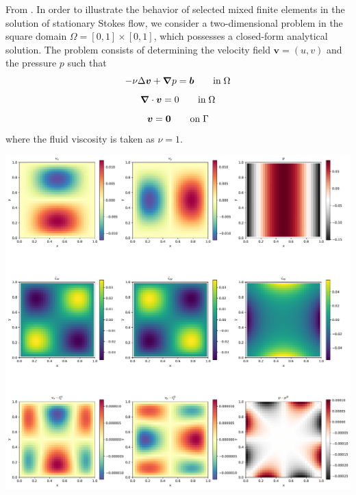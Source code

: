 
From \cite{dohu}. In order to illustrate the behavior of selected mixed finite elements in the solution 
of stationary Stokes flow,  we consider a two-dimensional problem 
in the square domain $\Omega=[0,1]\times[0,1]$, which possesses a closed-form analytical 
solution. The problem consists of determining the velocity field ${\bm v} = (u,v)$ and the 
pressure $p$ such that 
\[
-\nu \Delta {\bm v} + {\bm \nabla} p = {\bm b}  \quad\quad {\rm in} \; \Omega
\]
\[
{\bm \nabla} \cdot {\bm v} = 0 \quad\quad {\rm in} \; \Omega
\]
\[
{\bm v}={\bm 0} \quad\quad {\rm on} \; \Gamma
\]
where the fluid viscosity is taken as $\nu=1$. 



\includegraphics[width=16cm]{python_codes/fieldstone_01/solution.pdf}

